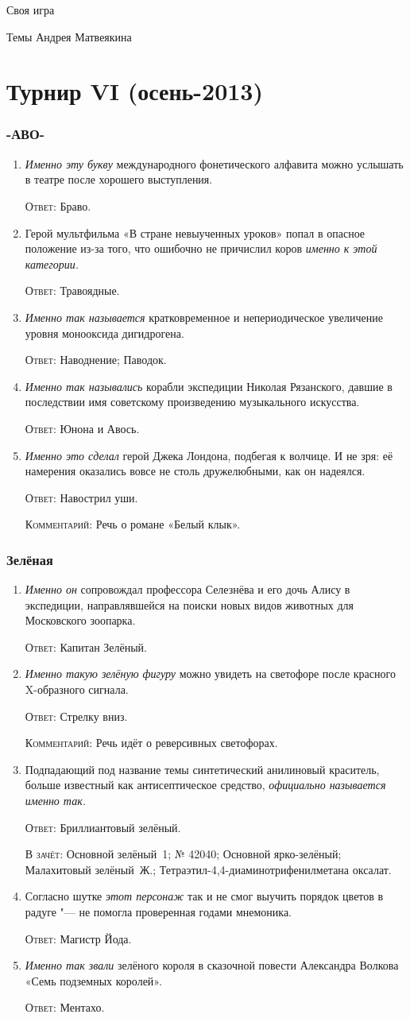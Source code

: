 \documentclass[a4paper,10pt]{article}
\let\keyword\textsc
\newenvironment{topic}{\begin{enumerate}}{\end{enumerate}}
\newcommand{\question}[3]{\item[#1.] #2 \par \keyword{Ответ:} #3}
\newcommand{\alternative}[1]{\par \keyword{В зачёт:} #1}
\newcommand{\commentary}[1]{\par \keyword{Комментарий:} #1}
\begin{document}
\begin{center}
 \Huge Своя игра
 \medskip

 \Large Темы Андрея Матвеякина
\end{center}
\bigskip


\tableofcontents



\newpage
\part{Турнир VI (осень-2013)}

\section{-АВО-}

\begin{topic}
 \question{10}{\emph{Именно эту букву} международного фонетического алфавита можно услышать в театре после хорошего выступления.}{Браво.}
 \question{20}{Герой мультфильма «В стране невыученных уроков» попал в опасное положение из-за того, что ошибочно не причислил коров \emph{именно к этой категории.}}{Травоядные.}
 \question{30}{\emph{Именно так называется} кратковременное и непериодическое увеличение уровня монооксида дигидрогена.}{Наводнение; Паводок.}
 \question{40}{\emph{Именно так назывались} корабли экспедиции Николая Рязанского, давшие в последствии имя советскому произведению музыкального искусства.}{Юнона и Авось.}
 \question{50}{\emph{Именно это сделал} герой Джека Лондона, подбегая к волчице. И не зря: её намерения оказались вовсе не столь дружелюбными, как он надеялся.}{Навострил уши.}\commentary{Речь о романе «Белый клык».}
\end{topic}


\section{Зелёная}

\begin{topic}
 \question{10}{\emph{Именно он} сопровождал профессора Селезнёва и его дочь Алису в экспедиции, направлявшейся на поиски новых видов животных для Московского зоопарка.}{Капитан Зелёный.}
 \question{20}{\emph{Именно такую зелёную фигуру} можно увидеть на светофоре после красного X-образного сигнала.}{Стрелку вниз.}\commentary{Речь идёт о реверсивных светофорах.}
 \question{30}{Подпадающий под название темы синтетический анилиновый краситель, больше известный как антисептическое средство, \emph{официально называется именно так.}}{Бриллиантовый зелёный.}\alternative{Основной зелёный~1; № 42040; Основной ярко-зелёный; Малахитовый зелёный~Ж.; Тетраэтил-4,4-диаминотрифенилметана оксалат.}
 \question{40}{Согласно шутке \emph{этот персонаж} так и не смог выучить порядок цветов в радуге "--- не помогла проверенная годами мнемоника.}{Магистр Йода.}
 \question{50}{\emph{Именно так звали} зелёного короля в сказочной повести Александра Волкова «Семь подземных королей».}{Ментахо.}
\end{topic}
\end{document}
